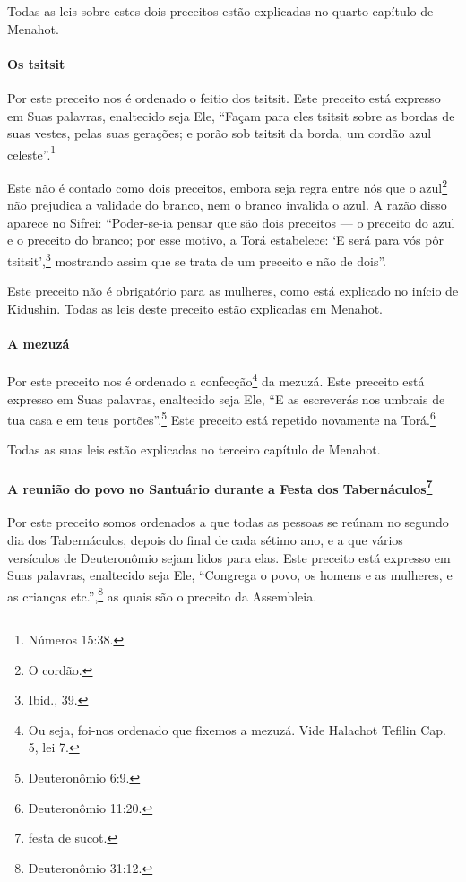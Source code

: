Todas as leis sobre estes dois preceitos estão explicadas no quarto
capítulo de Menahot.

\paragraph{Os tsitsit}

Por este preceito nos é ordenado o feitio dos tsitsit. Este
preceito está expresso em Suas palavras, enaltecido seja Ele, ``Façam
para eles tsitsit sobre as bordas de suas vestes, pelas suas gerações;
e porão sob tsitsit da borda, um cordão azul celeste''.\footnote{Números
15:38.}

Este não é contado como dois preceitos, embora seja regra entre nós que
o azul\footnote{O cordão.} não prejudica a validade do
branco, nem o branco invalida
o azul. A razão disso aparece no Sifrei:
``Poder-se-ia pensar que são dois preceitos --- o preceito do azul e o
preceito do branco; por esse motivo, a Torá estabelece: `E será para
vós pôr tsitsit',\footnote{Ibid., 39.} mostrando assim que se trata de um
preceito e não de dois''.

Este preceito não é obrigatório para as mulheres, como está explicado no
início de Kidushin. Todas as leis deste preceito estão explicadas em
Menahot.

\paragraph{A mezuzá}

Por este preceito nos é ordenado a confecção\footnote{Ou seja, foi-nos ordenado que fixemos a mezuzá. Vide Halachot Tefilin Cap. 5, lei 7.} da
mezuzá. Este
preceito está expresso em Suas palavras, enaltecido seja Ele, ``E as
escreverás
nos umbrais de tua casa e em teus portões''.\footnote{Deuteronômio 6:9.} Este
preceito está repetido novamente na Torá.\footnote{Deuteronômio 11:20.}

Todas as suas leis estão explicadas no terceiro capítulo de Menahot.

\paragraph{A reunião do povo no Santuário durante a Festa dos
Tabernáculos\protect\footnote{festa de sucot.}}

Por este preceito somos ordenados a que todas as pessoas se reúnam no
segundo dia dos Tabernáculos, depois do final de cada sétimo ano, e a
que vários versículos de Deuteronômio sejam lidos para elas. Este
preceito está expresso em Suas palavras, enaltecido seja Ele, ``Congrega
o povo, os homens e as mulheres, e as crianças etc.'',\footnote{Deuteronômio
31:12.} as quais são o preceito da Assembleia.

